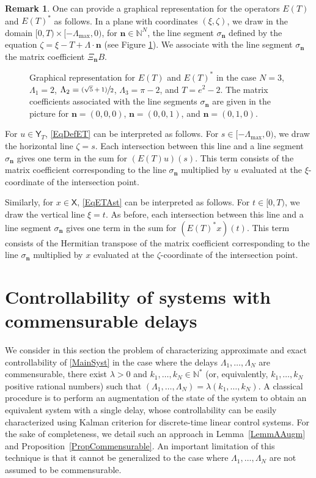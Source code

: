 \documentclass[JEP,XML,SOM,Unicode]{cedram}
\newcommand{\psfrac}[2]{\sfrac{(#1)}{#2}}
\newcommand{\bn}{\boldsymbol{n}}
\theoremstyle{plain}
\theoremstyle{definition}
\newtheorem{remk}[theo]{Remark}
\begin{document}
\begin{remk}
\label{RemkGraphic}
One can provide a graphical representation for the operators $E(T)$ and $E(T)^\ast$ as follows. In a plane with coordinates $(\xi, \zeta)$, we draw in the domain $[0, T) \times [-\Lambda_{\max}, 0)$, for $\bn \in \mathbb N^N$, the line segment $\sigma_{\bn}$ defined by the equation $\zeta = \xi - T + \Lambda \cdot \bn$ (see Figure \ref{FigET}). We associate with the line segment $\sigma_{\bn}$ the matrix coefficient $\Xi_{\bn} B$.

\begin{figure}[ht]
\centering

\caption{Graphical representation for $E(T)$ and $E(T)^\ast$ in the case $N = 3$, $\Lambda_1 = 2$, $\Lambda_2 = \psfrac{\sqrt{5}+1}{2}$, $\Lambda_3 = \pi - 2$, and $T = e^2 - 2$. The matrix coefficients associated with the line segments $\sigma_{\bn}$ are given in the picture for $\bn = (0, 0, 0)$, $\bn = (0, 0, 1)$, and $\bn = (0, 1, 0)$.}
\label{FigET}
\end{figure}

For $u \in \mathsf Y_T$, \eqref{EqDefET} can be interpreted as follows. For $s \in [-\Lambda_{\max}, 0)$, we draw the horizontal line $\zeta = s$. Each intersection between this line and a line segment $\sigma_{\bn}$ gives one term in the sum for $(E(T)u)(s)$. This term consists of the matrix coefficient corresponding to the line $\sigma_{\bn}$ multiplied by $u$ evaluated at the $\xi$-coordinate of the intersection point.

Similarly, for $x \in \mathsf X$, \eqref{EqETAst} can be interpreted as follows. For $t \in [0, T)$, we draw the vertical line $\xi = t$. As before, each intersection between this line and a line segment $\sigma_{\bn}$ gives one term in the sum for $(E(T)^\ast x)(t)$. This term consists of the Hermitian transpose of the matrix coefficient corresponding to the line $\sigma_{\bn}$ multiplied by $x$ evaluated at the $\zeta$-coordinate of the intersection point.
\end{remk}

\section{Controllability of systems with commensurable delays}
\label{SecCommensurable}

We consider in this section the problem of characterizing approximate and exact controllability of \eqref{MainSyst} in the case where the delays $\Lambda_1, \dots, \Lambda_N$ are commensurable, \ie there exist $\lambda > 0$ and $k_1, \dots, k_N \in \mathbb N^\ast$ (or, equivalently, $k_1, \dots, k_N$ positive rational numbers) such that $(\Lambda_1, \dots, \Lambda_N) = \lambda (k_1, \dots, k_N)$. A classical procedure is to perform an augmentation of the state of the system to obtain an equivalent system with a single delay, whose controllability can be easily characterized using Kalman criterion for discrete-time linear control systems. For the sake of completeness, we detail such an approach in Lemma~\ref{LemmAAugm} and Proposition~\ref{PropCommensurable}. An important limitation of this technique is that it cannot be generalized to the case where $\Lambda_1, \dots, \Lambda_N$ are not assumed to be commensurable.
\end{document}

